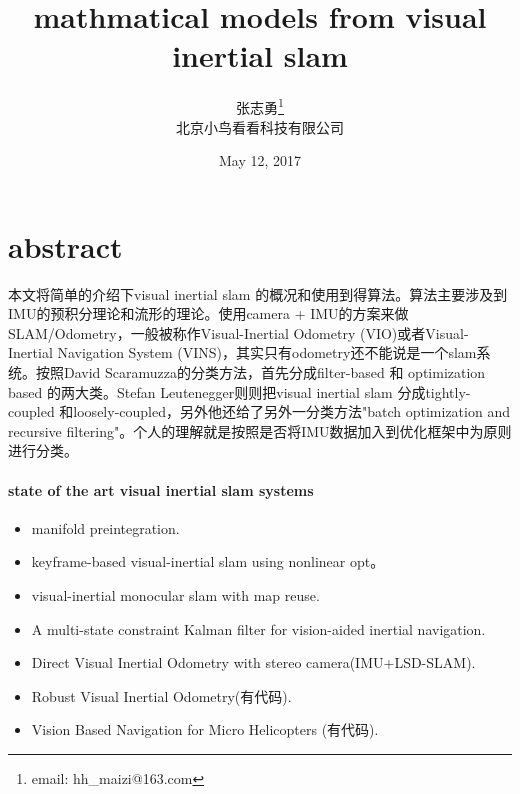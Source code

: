 \documentclass[10pt,a4paper]{article}
\author{张志勇\footnote{email: hh\_maizi@163.com}\\[2ex]
    北京小鸟看看科技有限公司\\[2ex]}
\title{mathmatical models from visual inertial slam}
\date{May 12, 2017}
\begin{document}
\makeatletter
\let\@afterindentfalse\@afterindenttrue
\@afterindenttrue
\makeatother
\setlength{\parindent}{2em}  %

\maketitle


\section{abstract}
本文将简单的介绍下visual inertial slam 的概况和使用到得算法。算法主要涉及到IMU的预积分理论和流形的理论。使用camera + IMU的方案来做SLAM/Odometry，一般被称作Visual-Inertial Odometry (VIO)或者Visual-Inertial Navigation System (VINS)，其实只有odometry还不能说是一个slam系统。按照David Scaramuzza的分类方法，首先分成filter-based 和 optimization based 的两大类。Stefan Leutenegger则则把visual inertial slam 分成tightly-coupled 和loosely-coupled，另外他还给了另外一分类方法"batch optimization and recursive filtering"。个人的理解就是按照是否将IMU数据加入到优化框架中为原则进行分类。
\paragraph{state of the art visual inertial slam systems}
\begin{itemize}
	\item manifold preintegration.%
	\item keyframe-based visual-inertial slam using nonlinear opt。%
	\item visual-inertial monocular slam with map reuse.%
	\item A multi-state constraint Kalman filter for vision-aided inertial navigation.%
	\item Direct Visual Inertial Odometry with stereo camera(IMU+LSD-SLAM).%
	\item Robust Visual Inertial Odometry(有代码).
	\item Vision Based Navigation for Micro Helicopters (有代码).
\end{itemize}
\end{document}
